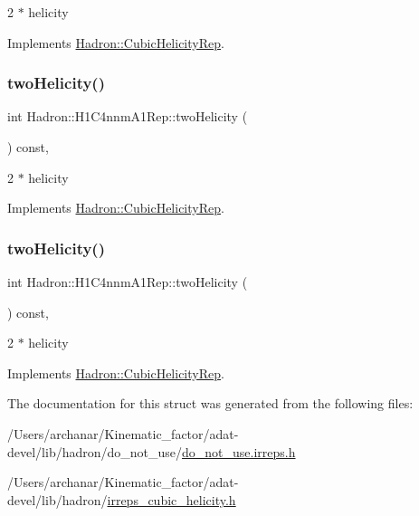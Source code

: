 2 $\ast$ helicity 

Implements \mbox{\hyperlink{structHadron_1_1CubicHelicityRep_af507aa56fc2747eacc8cb6c96db31ecc}{Hadron\+::\+Cubic\+Helicity\+Rep}}.

\mbox{\label{structHadron_1_1H1C4nnmA1Rep_aea3a7ff3c7439030c6189916e333af31}} 
\subsubsection{\texorpdfstring{twoHelicity()}{twoHelicity()}\hspace{0.1cm}{\footnotesize\ttfamily [2/3]}}
{\footnotesize\ttfamily int Hadron\+::\+H1\+C4nnm\+A1\+Rep\+::two\+Helicity (\begin{DoxyParamCaption}{ }\end{DoxyParamCaption}) const\hspace{0.3cm}{\ttfamily [inline]}, {\ttfamily [virtual]}}

2 $\ast$ helicity 

Implements \mbox{\hyperlink{structHadron_1_1CubicHelicityRep_af507aa56fc2747eacc8cb6c96db31ecc}{Hadron\+::\+Cubic\+Helicity\+Rep}}.

\mbox{\label{structHadron_1_1H1C4nnmA1Rep_aea3a7ff3c7439030c6189916e333af31}} 
\subsubsection{\texorpdfstring{twoHelicity()}{twoHelicity()}\hspace{0.1cm}{\footnotesize\ttfamily [3/3]}}
{\footnotesize\ttfamily int Hadron\+::\+H1\+C4nnm\+A1\+Rep\+::two\+Helicity (\begin{DoxyParamCaption}{ }\end{DoxyParamCaption}) const\hspace{0.3cm}{\ttfamily [inline]}, {\ttfamily [virtual]}}

2 $\ast$ helicity 

Implements \mbox{\hyperlink{structHadron_1_1CubicHelicityRep_af507aa56fc2747eacc8cb6c96db31ecc}{Hadron\+::\+Cubic\+Helicity\+Rep}}.



The documentation for this struct was generated from the following files\+:\begin{DoxyCompactItemize}
\item 
/\+Users/archanar/\+Kinematic\+\_\+factor/adat-\/devel/lib/hadron/do\+\_\+not\+\_\+use/\mbox{\hyperlink{adat-devel_2lib_2hadron_2do__not__use_2do__not__use_8irreps_8h}{do\+\_\+not\+\_\+use.\+irreps.\+h}}\item 
/\+Users/archanar/\+Kinematic\+\_\+factor/adat-\/devel/lib/hadron/\mbox{\hyperlink{adat-devel_2lib_2hadron_2irreps__cubic__helicity_8h}{irreps\+\_\+cubic\+\_\+helicity.\+h}}\end{DoxyCompactItemize}
